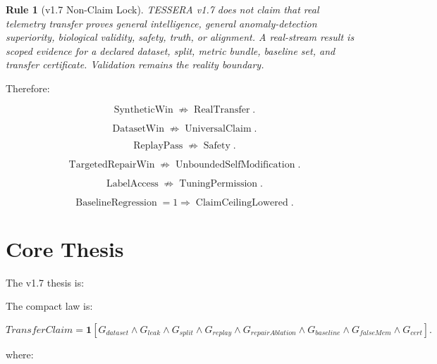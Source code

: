 \documentclass[12pt]{article}
\newtheorem{rulebox}{Rule}
\begin{document}
\begin{rulebox}[v1.7 Non-Claim Lock]
TESSERA v1.7 does not claim that real telemetry transfer proves general
intelligence, general anomaly-detection superiority, biological validity,
safety, truth, or alignment. A real-stream result is scoped evidence for a
declared dataset, split, metric bundle, baseline set, and transfer certificate.
Validation remains the reality boundary.
\end{rulebox}

Therefore:

\[
\operatorname{SyntheticWin}\not\Rightarrow\operatorname{RealTransfer}.
\]

\[
\operatorname{DatasetWin}\not\Rightarrow\operatorname{UniversalClaim}.
\]

\[
\operatorname{ReplayPass}\not\Rightarrow\operatorname{Safety}.
\]

\[
\operatorname{TargetedRepairWin}\not\Rightarrow\operatorname{UnboundedSelfModification}.
\]

\[
\operatorname{LabelAccess}\not\Rightarrow\operatorname{TuningPermission}.
\]

\[
\operatorname{BaselineRegression}=1\Rightarrow\operatorname{ClaimCeilingLowered}.
\]

\section{Core Thesis}

The v1.7 thesis is:

\begin{center}
\end{center}

The compact law is:

\[
\boxed{
TransferClaim
=
\mathbf{1}[G_{dataset}\wedge G_{leak}\wedge G_{split}\wedge G_{replay}
\wedge G_{repairAblation}\wedge G_{baseline}\wedge G_{falseMem}\wedge G_{cert}].
}
\]

where:
\end{document}
